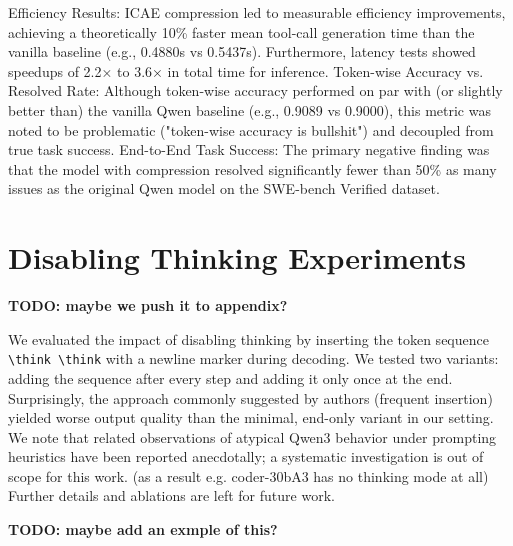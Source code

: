 Efficiency Results: ICAE \cite{ge_-context_2024} compression led to measurable efficiency improvements, achieving a theoretically 10\% faster mean tool-call generation time than the vanilla baseline (e.g., 0.4880s vs 0.5437s).
Furthermore, latency tests showed speedups of 2.2× to 3.6× in total time for inference.
Token-wise Accuracy vs. Resolved Rate: Although token-wise accuracy performed on par with (or slightly better than) the vanilla Qwen baseline (e.g., 0.9089 vs 0.9000), this metric was noted to be problematic ("token-wise accuracy is bullshit") and decoupled from true task success.
End-to-End Task Success: The primary negative finding was that the model with compression resolved significantly fewer than 50\% as many issues as the original Qwen model on the SWE-bench Verified dataset.


\section{Disabling Thinking Experiments}
\label{sec:disabling_thinking}

\textbf{TODO: maybe we push it to appendix?}

We evaluated the impact of disabling thinking by inserting the token sequence \texttt{\textbackslash think \textbackslash think} with a newline marker during decoding.
We tested two variants: adding the sequence after every step and adding it only once at the end.
Surprisingly, the approach commonly suggested by authors (frequent insertion) yielded worse output quality than the minimal, end-only variant in our setting.
We note that related observations of atypical Qwen3 behavior under prompting heuristics have been reported anecdotally; a systematic investigation is out of scope for this work. (as a result e.g. coder-30bA3 has no thinking mode at all)
Further details and ablations are left for future work.

\textbf{TODO: maybe add an exmple of this?}

